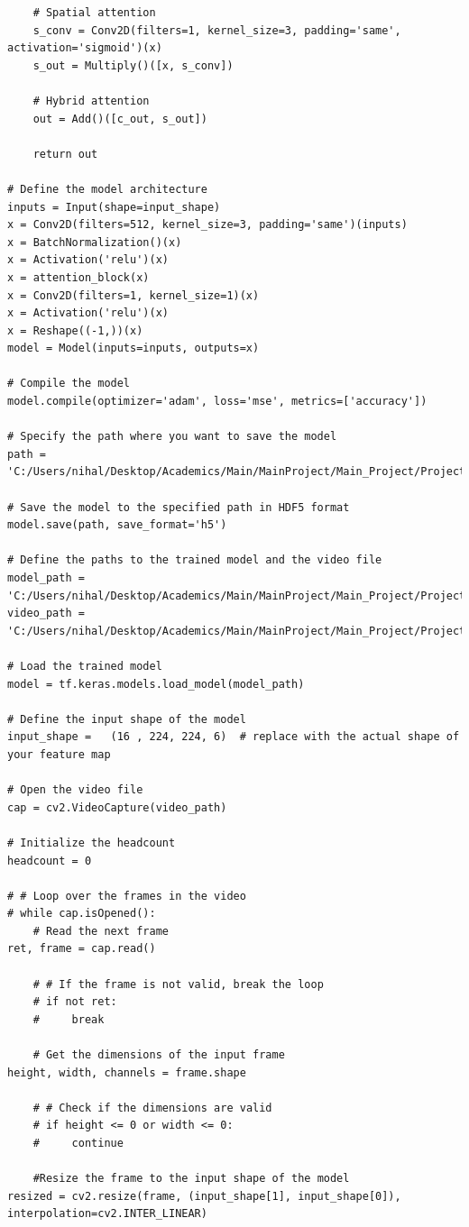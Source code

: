 \documentclass[12pt]{report}
\begin{document}
\begin{lstlisting}
    # Spatial attention
    s_conv = Conv2D(filters=1, kernel_size=3, padding='same', activation='sigmoid')(x)
    s_out = Multiply()([x, s_conv])
    
    # Hybrid attention
    out = Add()([c_out, s_out])
    
    return out

# Define the model architecture
inputs = Input(shape=input_shape)
x = Conv2D(filters=512, kernel_size=3, padding='same')(inputs)
x = BatchNormalization()(x)
x = Activation('relu')(x)
x = attention_block(x)
x = Conv2D(filters=1, kernel_size=1)(x)
x = Activation('relu')(x)
x = Reshape((-1,))(x)
model = Model(inputs=inputs, outputs=x)

# Compile the model
model.compile(optimizer='adam', loss='mse', metrics=['accuracy'])

# Specify the path where you want to save the model
path = 'C:/Users/nihal/Desktop/Academics/Main/MainProject/Main_Project/Project/model.h5'

# Save the model to the specified path in HDF5 format
model.save(path, save_format='h5')

# Define the paths to the trained model and the video file
model_path = 'C:/Users/nihal/Desktop/Academics/Main/MainProject/Main_Project/Project/model.h5'
video_path = 'C:/Users/nihal/Desktop/Academics/Main/MainProject/Main_Project/Project/videos/1.mp4'

# Load the trained model
model = tf.keras.models.load_model(model_path)

# Define the input shape of the model
input_shape =   (16 , 224, 224, 6)  # replace with the actual shape of your feature map

# Open the video file
cap = cv2.VideoCapture(video_path)

# Initialize the headcount
headcount = 0

# # Loop over the frames in the video
# while cap.isOpened():
    # Read the next frame
ret, frame = cap.read()

    # # If the frame is not valid, break the loop
    # if not ret:
    #     break
        
    # Get the dimensions of the input frame
height, width, channels = frame.shape
    
    # # Check if the dimensions are valid
    # if height <= 0 or width <= 0:
    #     continue
    
    #Resize the frame to the input shape of the model
resized = cv2.resize(frame, (input_shape[1], input_shape[0]), interpolation=cv2.INTER_LINEAR)
    

\end{lstlisting}
\end{document}
